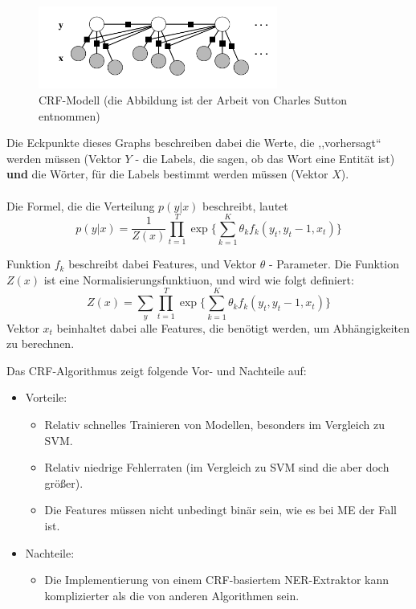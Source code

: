 \begin{figure}[ht]
\vbox{\small}
\includegraphics[width=0.7\textwidth]{Bilder/crf-modell-charles-andrew}
\caption{CRF-Modell (die Abbildung ist der Arbeit von Charles Sutton \cite{Charles/Andrew:10} entnommen)}
\label{fig:CRF-Modell}
\end{figure}
Die Eckpunkte dieses Graphs beschreiben dabei die Werte, die ,,vorhersagt`` werden müssen (Vektor $Y$ - die Labels, die sagen, ob das Wort eine Entität ist) \textbf{und} die Wörter, für die Labels bestimmt werden müssen (Vektor $X$)\cite{lafferty2001conditional}.

\paragraph{}
Die Formel, die die Verteilung $p(y|x)$ beschreibt, lautet 
\begin{equation} \label{eq:crfeq}
p(y|x) = \frac{1}{Z(x)}\prod_{t=1}^T\exp \lbrace \sum_{k=1}^K \theta_k f_k(y_t,y_t-1,x_t) \rbrace
\end{equation}

Funktion $f_k$ beschreibt dabei Features, und Vektor $\theta$ - Parameter. Die Funktion $Z(x)$ ist eine Normalisierungsfunktiuon, und wird wie folgt definiert:
\begin{equation} \label{eq:zeteq}
Z(x) = \sum_y \prod_{t=1}^T\exp \lbrace \sum_{k=1}^K \theta_k f_k(y_t,y_t-1,x_t) \rbrace
\end{equation}
Vektor $x_t$ beinhaltet dabei alle Features, die benötigt werden, um Abhängigkeiten zu berechnen. 

Das CRF-Algorithmus zeigt folgende Vor- und Nachteile auf:
\begin{itemize}
\item Vorteile:
\begin{itemize}
\item Relativ schnelles Trainieren von Modellen\cite{sha2003shallow}, besonders im Vergleich zu SVM.
\item Relativ niedrige Fehlerraten (im Vergleich zu SVM sind die aber doch größer).
\item Die Features müssen nicht unbedingt binär sein, wie es bei ME der Fall ist.
\end{itemize}
\item Nachteile:
\begin{itemize}
\item Die Implementierung von einem CRF-basiertem NER-Extraktor kann komplizierter als die von anderen Algorithmen sein.
\end{itemize}
\end{itemize}


